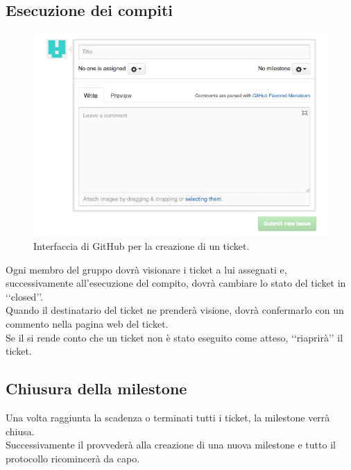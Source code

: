 \subsection{Esecuzione dei compiti}
\label{esecuzionecompiti}
\begin{figure}[h!]
	\centering
	\includegraphics[width=12cm]{./content/Immagini/Screen2.png}
	\caption{Interfaccia di GitHub per la creazione di un ticket.}
\end{figure}
Ogni membro del gruppo dovrà visionare i ticket a lui assegnati e, successivamente all'esecuzione del compito, dovrà cambiare lo stato del ticket in \lq\lq{}closed\rq\rq{}.
\\Quando il destinatario del ticket ne prenderà visione, dovrà confermarlo con un commento nella pagina web del ticket. 
\\Se il \projectManager{} si rende conto che un ticket non è stato eseguito come atteso, \lq\lq{}riaprirà\rq\rq{} il ticket.
\subsection{Chiusura della milestone}
\label{chiusura}
Una volta raggiunta la scadenza o terminati tutti i ticket, la milestone\glossario{} verrà chiusa.
\\Successivamente il \projectManager{} provvederà alla creazione di una nuova milestone\glossario{} e tutto il protocollo ricomincerà da capo.
